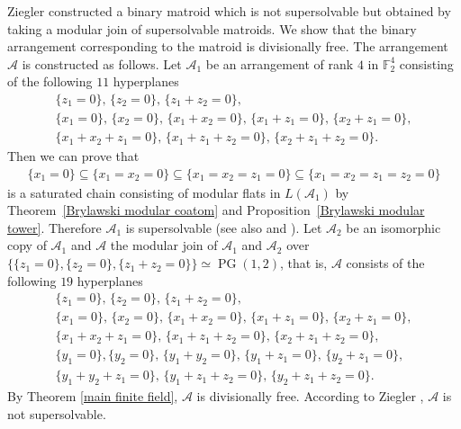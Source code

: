 \documentclass[pdftex]{sigma}
\numberwithin{equation}{section}
\DeclareMathOperator{\PG}{PG}
\begin{document}
\begin{Example}
Ziegler \cite[Example 4.3]{ziegler1991binary-potams} constructed a binary matroid which is not supersolvable but obtained by taking a modular join of supersolvable matroids.
We show that the binary arrangement corresponding to the matroid is divisionally free.
The arrangement $ \mathcal{A} $ is constructed as follows.
Let $ \mathcal{A}_{1} $ be an arrangement of rank $ 4 $ in $ \mathbb{F}_{2}^{4} $ consisting of the following $ 11 $ hyperplanes
\begin{gather*}
 \{z_{1}=0\},\, \{z_{2}=0\}, \,\{z_{1}+z_{2}=0\}, \\
 \{x_{1}=0\}, \,\{x_{2}=0\}, \,\{x_{1}+x_{2}=0\},\, \{x_{1}+z_{1}=0\}, \,\{x_{2}+z_{1}=0\}, \\
 \{x_{1}+x_{2}+z_{1}=0\}, \,\{x_{1}+z_{1}+z_{2}=0\},\, \{x_{2}+z_{1}+z_{2}=0\}.
\end{gather*}
Then we can prove that
\begin{gather*}
\{x_{1}=0\} \subseteq \{x_{1}=x_{2}=0\} \subseteq \{x_{1}=x_{2}=z_{1}=0\} \subseteq \{x_{1}=x_{2}=z_{1}=z_{2}=0\}
\end{gather*}
is a saturated chain consisting of modular flats in $ L(\mathcal{A}_{1}) $ by Theorem~\ref{Brylawski modular coatom} and Proposition~\ref{Brylawski modular tower}.
Therefore $ \mathcal{A}_{1} $ is supersolvable (see also \cite[Corollary~2.17]{terao1986modular-aim} and \cite[Theorem~4.3]{bjorner1990hyperplane-dcg}).
Let $ \mathcal{A}_{2} $ be an isomorphic copy of $ \mathcal{A}_{1} $ and $ \mathcal{A} $ the modular join of $ \mathcal{A}_{1} $ and $ \mathcal{A}_{2} $ over $ \{\{z_{1}=0\}, \{z_{2}=0\}, \{z_{1}+z_{2}=0\} \} \simeq \PG(1,2) $, that is, $ \mathcal{A} $ consists of the following $ 19 $ hyperplanes
\begin{gather*}
 \{z_{1}=0\}, \,\{z_{2}=0\}, \,\{z_{1}+z_{2}=0\}, \\
 \{x_{1}=0\}, \,\{x_{2}=0\},\, \{x_{1}+x_{2}=0\}, \,\{x_{1}+z_{1}=0\}, \,\{x_{2}+z_{1}=0\}, \\
 \{x_{1}+x_{2}+z_{1}=0\}, \,\{x_{1}+z_{1}+z_{2}=0\},\, \{x_{2}+z_{1}+z_{2}=0\}, \\
 \{y_{1}=0\}, \{y_{2}=0\}, \,\{y_{1}+y_{2}=0\}, \,\{y_{1}+z_{1}=0\},\, \{y_{2}+z_{1}=0\}, \\
 \{y_{1}+y_{2}+z_{1}=0\}, \,\{y_{1}+z_{1}+z_{2}=0\}, \,\{y_{2}+z_{1}+z_{2}=0\}.
\end{gather*}
By Theorem \ref{main finite field}, $ \mathcal{A} $ is divisionally free.
According to Ziegler \cite[Example~4.3]{ziegler1991binary-potams}, $ \mathcal{A} $ is not supersolvable.
\end{Example}
\end{document}
